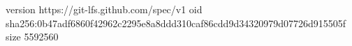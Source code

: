version https://git-lfs.github.com/spec/v1
oid sha256:0b47adf6860f42962c2295e8a8ddd310caf86cdd9d34320979d07726d915505f
size 5592560

